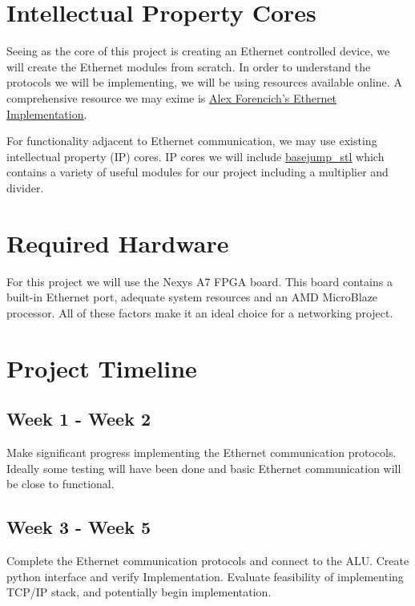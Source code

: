 \documentclass{article}
\begin{document}
\section*{Intellectual Property Cores}

Seeing as the core of this project is creating an Ethernet controlled device, we will create the Ethernet modules from scratch. In order to understand the protocols we will be implementing, we will be using resources available online. A comprehensive resource we may exime is \href{https://github.com/alexforencich/verilog-ethernet/tree/master/example/NexysVideo/fpga}{\underline{Alex Forencich's Ethernet Implementation}}.

For functionality adjacent to Ethernet communication, we may use existing intellectual property (IP) cores. IP cores we will include \href{https://github.com/bespoke-silicon-group/basejump_stl}{\underline{basejump\_stl}} which contains a variety of useful modules for our project including a multiplier and divider.

\section*{Required Hardware}

For this project we will use the Nexys A7 FPGA board. This board contains a built-in Ethernet port, adequate system resources and an AMD MicroBlaze processor. All of these factors make it an ideal choice for a networking project.

\section*{Project Timeline}

\subsection*{Week 1 - Week 2}

Make significant progress implementing the Ethernet communication protocols. Ideally some testing will have been done and basic Ethernet communication will be close to functional.

\subsection*{Week 3 - Week 5}

Complete the Ethernet communication protocols and connect to the ALU. Create python interface and verify Implementation. Evaluate feasibility of implementing TCP/IP stack, and potentially begin implementation.
\end{document}
